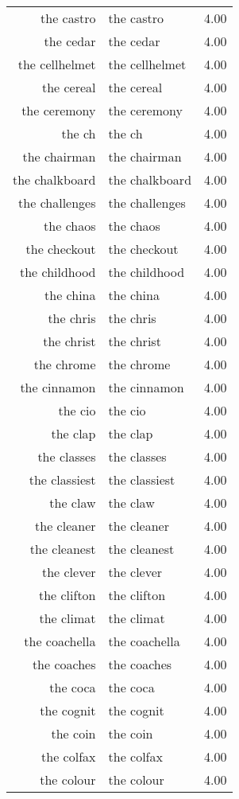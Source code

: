 \begin{table}[ht]
\begin{tabular}{rlr}
  the castro & the castro & 4.00 \\ 
  the cedar & the cedar & 4.00 \\ 
  the cellhelmet & the cellhelmet & 4.00 \\ 
  the cereal & the cereal & 4.00 \\ 
  the ceremony & the ceremony & 4.00 \\ 
  the ch & the ch & 4.00 \\ 
  the chairman & the chairman & 4.00 \\ 
  the chalkboard & the chalkboard & 4.00 \\ 
  the challenges & the challenges & 4.00 \\ 
  the chaos & the chaos & 4.00 \\ 
  the checkout & the checkout & 4.00 \\ 
  the childhood & the childhood & 4.00 \\ 
  the china & the china & 4.00 \\ 
  the chris & the chris & 4.00 \\ 
  the christ & the christ & 4.00 \\ 
  the chrome & the chrome & 4.00 \\ 
  the cinnamon & the cinnamon & 4.00 \\ 
  the cio & the cio & 4.00 \\ 
  the clap & the clap & 4.00 \\ 
  the classes & the classes & 4.00 \\ 
  the classiest & the classiest & 4.00 \\ 
  the claw & the claw & 4.00 \\ 
  the cleaner & the cleaner & 4.00 \\ 
  the cleanest & the cleanest & 4.00 \\ 
  the clever & the clever & 4.00 \\ 
  the clifton & the clifton & 4.00 \\ 
  the climat & the climat & 4.00 \\ 
  the coachella & the coachella & 4.00 \\ 
  the coaches & the coaches & 4.00 \\ 
  the coca & the coca & 4.00 \\ 
  the cognit & the cognit & 4.00 \\ 
  the coin & the coin & 4.00 \\ 
  the colfax & the colfax & 4.00 \\ 
  the colour & the colour & 4.00 \\ 

\end{tabular}
\end{table}
